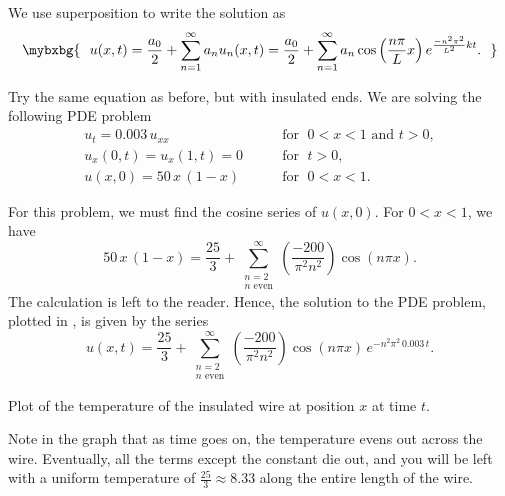 We use superposition to write the solution as
\begin{equation*}
\mybxbg{~~
u(x,t) = 
\frac{a_0}{2} + 
\sum_{n=1}^\infty
a_n
u_n(x,t)
=
\frac{a_0}{2} + 
\sum_{n=1}^\infty
a_n
\cos \left( \frac{n \pi}{L} x \right)
e^{\frac{-n^2 \pi^2}{L^2} k t} .
~~}
\end{equation*}

\begin{example}
Try the same equation as before, but with insulated ends.
We are solving the following PDE problem
\begin{equation*}
\begin{array}{ll}
u_t = 0.003 \, u_{xx} & \qquad \text{for } \; 0 < x < 1 \text{ and } t > 0, \\
u_x(0,t) = u_x(1,t) = 0  & \qquad  \text{for } \; t > 0, \\
u(x,0) = 50\,x\,(1-x) & \qquad \text{for } \; 0 < x < 1 .
\end{array}
\end{equation*}


For this problem, we must find the cosine series of $u(x,0)$.
For $0 < x < 1$, we have
\begin{equation*}
50\, x\,(1-x)
=
\frac{25}{3} +
\sum_{\substack{n=2 \\ n \text{ even}}}^\infty
\left( \frac{-200}{\pi^2 n^2} \right)
\cos (n \pi x) .
\end{equation*}
The calculation is left to the reader.
Hence, the solution to the PDE problem, plotted in
, is given by the series
\begin{equation*}
u(x,t)
=
\frac{25}{3} +
\sum_{\substack{n=2 \\ n \text{ even}}}^\infty
\left( \frac{-200}{\pi^2 n^2} \right)
\cos ( n \pi x)
\, e^{-n^2 \pi^2 \, 0.003 \, t} .
\end{equation*}

\begin{myfig}
\capstart
{}
\caption{Plot of the temperature of the insulated wire at position $x$
at time $t$.\label{heat:wireisolexfig}}
\end{myfig}

Note in the graph
that as time goes on, the temperature evens out across the wire.  Eventually, all the
terms except the constant
die out, and you will be left with a uniform temperature
of $\frac{25}{3} \approx 8.33$ along the entire length of the wire.
\end{example}

